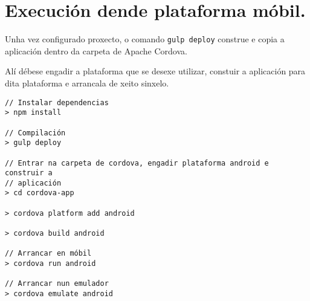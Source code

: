   \section{Execución dende plataforma móbil.}

  Unha vez configurado proxecto, o comando \lstinline{gulp deploy} construe 
e copia a aplicación dentro da carpeta de Apache Cordova.

  Alí débese engadir a plataforma que se desexe utilizar, constuir a 
aplicación para dita plataforma e arrancala de xeito sinxelo.

    \lstset{}
    \begin{lstlisting}[caption=Configuración e execución móbil]
// Instalar dependencias
> npm install

// Compilación
> gulp deploy

// Entrar na carpeta de cordova, engadir plataforma android e construir a 
// aplicación
> cd cordova-app

> cordova platform add android

> cordova build android

// Arrancar en móbil
> cordova run android

// Arrancar nun emulador
> cordova emulate android

    \end{lstlisting}

\thispagestyle{empty}
